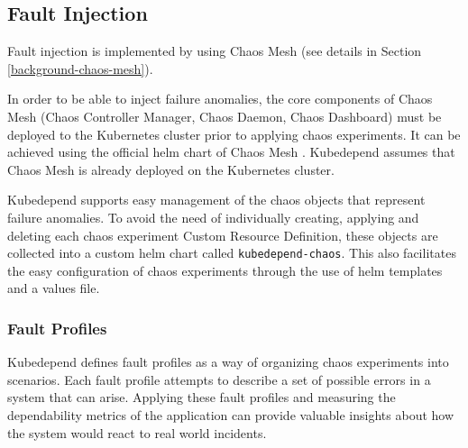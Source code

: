 \subsection{Fault Injection}


Fault injection is implemented by using Chaos Mesh (see details in Section \ref{background-chaos-mesh}).

In order to be able to inject failure anomalies, the core components of Chaos Mesh (Chaos Controller Manager, Chaos Daemon, Chaos Dashboard) must be deployed to the Kubernetes cluster prior to applying chaos experiments. It can be achieved using the official helm chart of Chaos Mesh \cite{ChaosMeshChart}. Kubedepend assumes that Chaos Mesh is already deployed on the Kubernetes cluster.

Kubedepend supports easy management of the chaos objects that represent failure anomalies. To avoid the need of individually creating, applying and deleting each chaos experiment Custom Resource Definition, these objects are collected into a custom helm chart called \texttt{kubedepend-chaos}. This also facilitates the easy configuration of chaos experiments through the use of helm templates and a values file.

\subsubsection{Fault Profiles} \label{test-impl-fault-profiles}


Kubedepend defines fault profiles as a way of organizing chaos experiments into scenarios. Each fault profile attempts to describe a set of possible errors in a system that can arise. Applying these fault profiles and measuring the dependability metrics of the application can provide valuable insights about how the system would react to real world incidents.

